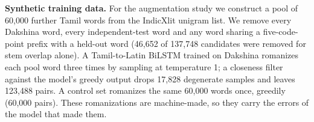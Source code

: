 \textbf{Synthetic training data.}
For the augmentation study we construct a pool of 60{,}000 further Tamil words from the IndicXlit unigram list.
We remove every Dakshina word, every independent-test word and any word sharing a five-code-point prefix with a held-out word (46{,}652 of 137{,}748 candidates were removed for stem overlap alone).
A Tamil-to-Latin BiLSTM trained on Dakshina romanizes each pool word three times by sampling at temperature 1; a closeness filter against the model's greedy output drops 17{,}828 degenerate samples and leaves 123{,}488 pairs.
A control set romanizes the same 60{,}000 words once, greedily (60{,}000 pairs).
These romanizations are machine-made, so they carry the errors of the model that made them.
